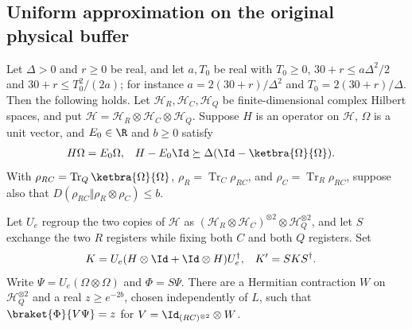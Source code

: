 \subsection{Uniform approximation on the original physical buffer}
\label{sec:gaussian_physical_uniform}


\begin{theorem}
    \label{thm:gaussian_physical_uniform}
    \leanok
    Let $\Delta>0$ and $r\ge0$ be real, and let $a,T_0$ be real with $T_0\ge0$,
    $30+r\le a\Delta^2/2$ and $30+r\le T_0^2/(2a)$; for instance
    $a=2(30+r)/\Delta^2$ and $T_0=2(30+r)/\Delta$. Then the following holds.
    Let $\mathcal H_R,\mathcal H_C,\mathcal H_Q$ be finite-dimensional
    complex Hilbert spaces, and put
    $\mathcal H=\mathcal H_R\otimes\mathcal H_C\otimes\mathcal H_Q$.
    Suppose $H$ is an operator on $\mathcal H$, $\Omega$ is a unit vector,
    and $E_0\in\R$ and $b\ge0$ satisfy
    \begin{align}
        H\Omega&=E_0\Omega,
        & H-E_0\Id&\succeq\Delta(\Id-\ketbra{\Omega}{\Omega}).
        \label{eq:physical_uniform_original_gap}
    \end{align}
    With $\rho_{RC}=\operatorname{Tr}_Q\ketbra{\Omega}{\Omega}$,
    $\rho_R=\operatorname{Tr}_C\rho_{RC}$, and
    $\rho_C=\operatorname{Tr}_R\rho_{RC}$, suppose also that
    $D(\rho_{RC}\Vert\rho_R\otimes\rho_C)\le b$.

    Let $U_e$ regroup the two copies of $\mathcal H$ as
    $(\mathcal H_R\otimes\mathcal H_C)^{\otimes2}
        \otimes\mathcal H_Q^{\otimes2}$, and let $S$ exchange the two
    $R$ registers while fixing both $C$ and both $Q$ registers. Set
    \begin{align}
        K&=U_e(H\otimes\Id+\Id\otimes H)U_e^\dagger,
        & K'&=SKS^\dagger.
        \label{eq:physical_uniform_generators}
    \end{align}
    Write $\Psi=U_e(\Omega\otimes\Omega)$ and $\Phi=S\Psi$.
    There are a Hermitian contraction $W$ on $\mathcal H_Q^{\otimes2}$
    and a real $z\ge e^{-2b}$, chosen independently of $L$, such that
    $\braket{\Phi}{V\Psi}=z$ for
    $V=\Id_{(RC)^{\otimes2}}\otimes W$.


\end{theorem}
